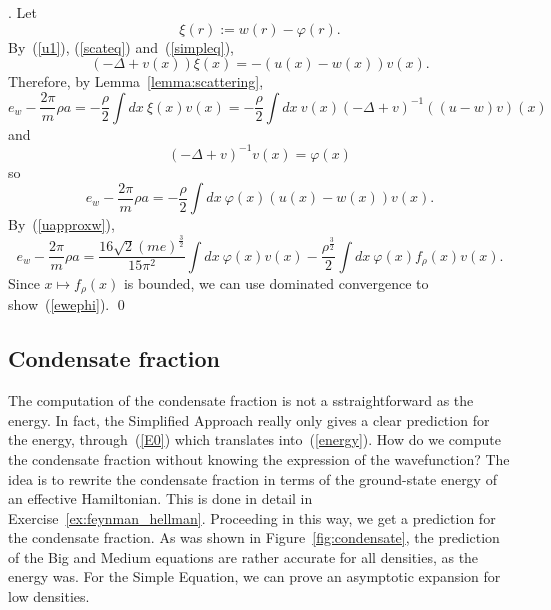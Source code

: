 \documentclass{ian}
\begin{document}
  \bigskip

  .
  Let
  \begin{equation}
    \xi(r):=w(r)-\varphi(r).
    \label{xi}
  \end{equation}
  By\-~(\ref{u1}), (\ref{scateq}) and\-~(\ref{simpleq}),
  \begin{equation}
    (-\Delta+v(x))\xi(x)=-(u(x)-w(x))v(x)
    .
  \end{equation}
  Therefore, by Lemma\-~\ref{lemma:scattering},
  \begin{equation}
    e_w-\frac{2\pi}m\rho a=-\frac\rho2\int dx\ \xi(x)v(x)
    =-\frac\rho2\int dx\ v(x)(-\Delta+v)^{-1}((u-w)v)(x)
  \end{equation}
  and
  \begin{equation}
    (-\Delta+v)^{-1}v(x)=\varphi(x)
  \end{equation}
  so
  \begin{equation}
    e_w-\frac{2\pi}m\rho a
    =-\frac\rho2\int dx\ \varphi(x)(u(x)-w(x))v(x)
    .
  \end{equation}
  By\-~(\ref{uapproxw}),
  \begin{equation}
    e_w-\frac{2\pi}m\rho a
    =\frac{16\sqrt 2(me)^{\frac32}}{15\pi^2}\int dx\ \varphi(x)v(x)
    -\frac{\rho^{\frac32}}2\int dx\ \varphi(x)f_\rho(x)v(x)
    .
  \end{equation}
  Since $x\mapsto f_\rho(x)$ is bounded, we can use dominated convergence to show\-~(\ref{ewephi}).
\qed

\subsection{Condensate fraction}
\indent
The computation of the condensate fraction is not a sstraightforward as the energy.
In fact, the Simplified Approach really only gives a clear prediction for the energy, through\-~(\ref{E0}) which translates into\-~(\ref{energy}).
How do we compute the condensate fraction without knowing the expression of the wavefunction?
The idea is to rewrite the condensate fraction in terms of the ground-state energy of an effective Hamiltonian.
This is done in detail in Exercise\-~\ref{ex:feynman_hellman}.
Proceeding in this way, we get a prediction for the condensate fraction.
As was shown in Figure\-~\ref{fig:condensate}, the prediction of the Big and Medium equations are rather accurate for all densities, as the energy was.
For the Simple Equation, we can prove an asymptotic expansion for low densities.
\bigskip
\end{document}
